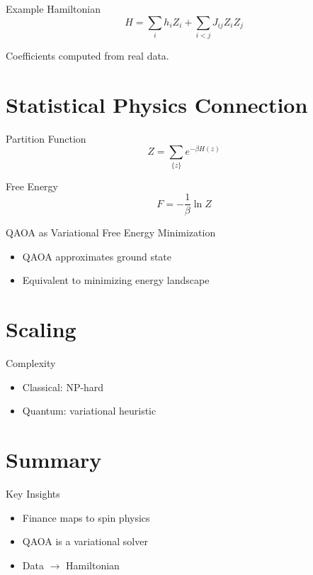 \documentclass[aspectratio=169]{beamer}
\begin{document}
\begin{frame}{Example Hamiltonian}
\[
H = \sum_i h_i Z_i + \sum_{i<j} J_{ij} Z_i Z_j
\]

Coefficients computed from real data.
\end{frame}

\section{Statistical Physics Connection}

\begin{frame}{Partition Function}
\[
Z = \sum_{\{z\}} e^{-\beta H(z)}
\]
\end{frame}

\begin{frame}{Free Energy}
\[
F = -\frac{1}{\beta} \ln Z
\]
\end{frame}

\begin{frame}{QAOA as Variational Free Energy Minimization}
\begin{itemize}
\item QAOA approximates ground state
\item Equivalent to minimizing energy landscape
\end{itemize}
\end{frame}

\section{Scaling}

\begin{frame}{Complexity}
\begin{itemize}
\item Classical: NP-hard
\item Quantum: variational heuristic
\end{itemize}
\end{frame}

\section{Summary}

\begin{frame}{Key Insights}
\begin{itemize}
\item Finance maps to spin physics
\item QAOA is a variational solver
\item Data $\rightarrow$ Hamiltonian
\end{itemize}
\end{frame}
\end{document}
